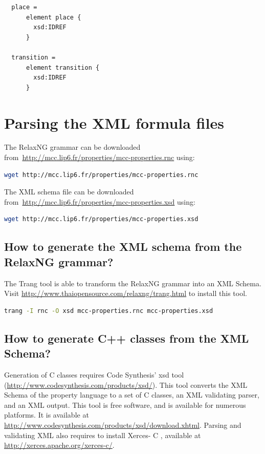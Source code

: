 \documentclass[10pt,english,a4paper]{article}
\newcommand{\CC}{%
  C\nolinebreak\hspace{-.05em}\raisebox{.4ex}{\scriptsize\bf +}\nolinebreak\hspace{-.10em}\raisebox{.4ex}{\scriptsize\bf +}%
}
\begin{document}
\begin{lstlisting}
  place =
      element place {
        xsd:IDREF
      }

  transition =
      element transition {
        xsd:IDREF
      }
\end{lstlisting}


\section{Parsing the XML formula files}
\label{s:parsing}

The RelaxNG grammar can be downloaded from~\url{http://mcc.lip6.fr/properties/mcc-properties.rnc} using:
\begin{lstlisting}[language=sh]
  wget http://mcc.lip6.fr/properties/mcc-properties.rnc
\end{lstlisting}

The XML schema file can be downloaded from~\url{http://mcc.lip6.fr/properties/mcc-properties.xsd} using:
\begin{lstlisting}[language=sh]
  wget http://mcc.lip6.fr/properties/mcc-properties.xsd
\end{lstlisting}

\subsection{How to generate the XML schema from the RelaxNG grammar?}
The Trang tool is able to transform the RelaxNG grammar into an XML Schema.
Visit \url{http://www.thaiopensource.com/relaxng/trang.html} to install this tool.

\begin{lstlisting}[language=sh]
  trang -I rnc -O xsd mcc-properties.rnc mcc-properties.xsd
\end{lstlisting}

\subsection{How to generate C++ classes from the XML Schema?}
Generation of {\CC} classes requires Code Synthesis' xsd tool
(\url{http://www.codesynthesis.com/products/xsd/}).
This tool converts the XML Schema of the property language to a set of \CC{} classes,
an XML validating parser, and an XML output.
This tool is free software, and is available for numerous platforms.
It is available at \url{http://www.codesynthesis.com/products/xsd/download.xhtml}.
Parsing and validating XML also requires to install Xerces-\CC{},
available at \url{http://xerces.apache.org/xerces-c/}.
\end{document}
